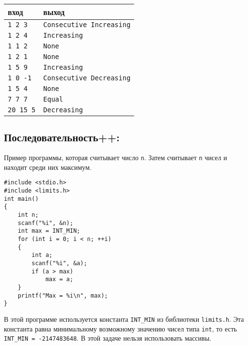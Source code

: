 \documentclass{article}
\begin{document}
\begin{center}
\begin{tabular}{ l l }
 вход & выход \\ \hline
 \texttt{1 2 3} & \texttt{Consecutive Increasing}  \\ 
 \texttt{1 2 4} & \texttt{Increasing}  \\
 \texttt{1 1 2} & \texttt{None} \\ 
 \texttt{1 2 1} & \texttt{None} \\ 
 \texttt{1 5 9} & \texttt{Increasing}  \\ 
 \texttt{1 0 -1} & \texttt{Consecutive Decreasing}  \\ 
 \texttt{1 5 4} & \texttt{None} \\ 
 \texttt{7 7 7} & \texttt{Equal} \\  
 \texttt{20 15 5} & \texttt{Decreasing} \\
\end{tabular}
\end{center}


\subsection{Последовательность++:} 
Пример программы, которая считывает число \texttt{n}. Затем считывает \texttt{n} чисел и находит среди них максимум. 

\begin{lstlisting}
#include <stdio.h>
#include <limits.h>
int main() 
{
    int n;
    scanf("%i", &n);
    int max = INT_MIN;
    for (int i = 0; i < n; ++i) 
    {
        int a;
        scanf("%i", &a);
        if (a > max)
            max = a;
    }
    printf("Max = %i\n", max);
}
\end{lstlisting}
В этой программе используется константа \texttt{INT\_MIN} из библиотеки \texttt{limits.h}. Эта константа равна минимальному возможному значению чисел типа \texttt{int}, то есть \texttt{INT\_MIN = -2147483648}. В этой задаче нельзя использовать массивы.
\end{document}
